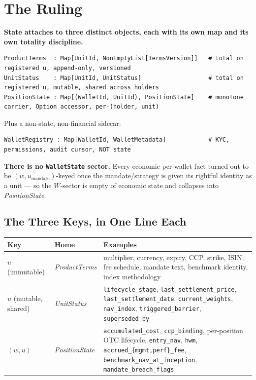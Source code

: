 \documentclass[11pt,a4paper]{article}
\begin{document}
\section{The Ruling}
\label{sec:ruling}

\textbf{State attaches to three distinct objects, each with its own map and its own totality discipline.}

\begin{lstlisting}
ProductTerms  : Map[UnitId, NonEmptyList[TermsVersion]]   # total on registered u, append-only, versioned
UnitStatus    : Map[UnitId, UnitStatus]                   # total on registered u, mutable, shared across holders
PositionState : Map[(WalletId, UnitId), PositionState]    # monotone carrier, Option accessor, per-(holder, unit)
\end{lstlisting}

\noindent Plus a non-state, non-financial sidecar:

\begin{lstlisting}
WalletRegistry : Map[WalletId, WalletMetadata]            # KYC, permissions, audit cursor, NOT state
\end{lstlisting}

\noindent \textbf{There is no \texttt{WalletState} sector.} Every economic per-wallet fact turned out to be $(w, u_{\mathrm{mandate}})$-keyed once the mandate/strategy is given its rightful identity as a unit --- so the $W$-sector is empty of economic state and collapses into \textit{PositionState}.

\subsection{The Three Keys, in One Line Each}

\begin{longtable}{p{3.5cm}p{3cm}p{8cm}}
\toprule
\textbf{Key} & \textbf{Home} & \textbf{Examples} \\
\midrule
$u$ (immutable) & \textit{ProductTerms} & multiplier, currency, expiry, CCP, strike, ISIN, fee schedule, mandate text, benchmark identity, index methodology \\
\addlinespace
$u$ (mutable, shared) & \textit{UnitStatus} & \texttt{lifecycle\_stage}, \texttt{last\_settlement\_price}, \texttt{last\_settlement\_date}, \texttt{current\_weights}, \texttt{nav\_index}, \texttt{triggered\_barrier}, \texttt{superseded\_by} \\
\addlinespace
$(w, u)$ & \textit{PositionState} & \texttt{accumulated\_cost}, \texttt{ccp\_binding}, per-position OTC lifecycle, \texttt{entry\_nav}, \texttt{hwm}, \texttt{accrued\_\{mgmt,perf\}\_fee}, \texttt{benchmark\_nav\_at\_inception}, \texttt{mandate\_breach\_flags} \\
\bottomrule
\end{longtable}
\end{document}
